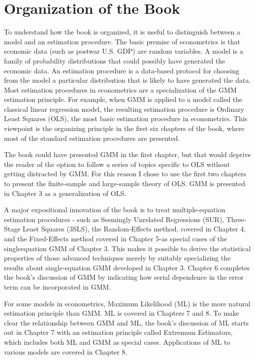 \documentclass[10pt]{article}
\begin{document}
\section*{Organization of the Book}
To understand how the book is organized, it is useful to distinguish between a model and an estimation procedure. The basic premise of econometrics is that economic data (such as postwar U.S. GDP) are random variables. A model is a\\
family of probability distributions that could possibly have generated the economic data. An estimation procedure is a data-based protocol for choosing from the model a particular distribution that is likely to have generated the data. Most estimation procedures in econometrics are a specialization of the GMM estimation principle. For example, when GMM is applied to a model called the classical linear regression model, the resulting estimation procedure is Ordinary Least Squares (OLS), the most basic estimation procedure in econometrics. This viewpoint is the organizing principle in the first six chapters of the book, where most of the standard estimation procedures are presented.

The book could have presented GMM in the first chapter, but that would deprive the reader of the option to follow a series of topics specific to OLS without getting distracted by GMM. For this reason I chose to use the first two chapters to present the finite-sample and large-sample theory of OLS. GMM is presented in Chapter 3 as a generalization of OLS.

A major expositional innovation of the book is to treat multiple-equation estimation procedures - such as Seemingly Unrelated Regressions (SUR), Three-Stage Least Squares (3SLS), the Random-Effects method, covered in Chapter 4, and the Fixed-Effects method covered in Chapter 5-as special cases of the singleequation GMM of Chapter 3. This makes it possible to derive the statistical properties of those advanced techniques merely by suitably specializing the results about single-equation GMM developed in Chapter 3. Chapter 6 completes the book's discussion of GMM by indicating how serial dependence in the error term can be incorporated in GMM.

For some models in econometrics, Maximum Likelihood (ML) is the more natural estimation principle than GMM. ML is covered in Chapters 7 and 8. To make clear the relationship between GMM and ML, the book's discussion of ML starts out in Chapter 7 with an estimation principle called Extremum Estimators, which includes both ML and GMM as special cases. Applications of ML to various models are covered in Chapter 8.
\end{document}
